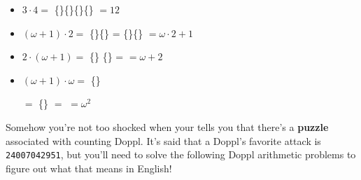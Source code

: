 \begin{itemize}
\item \(3\cdot 4=\)
\{\mappDoppl\mappDoppl\mappDoppl\}\{\mappDoppl\mappDoppl\mappDoppl\}\{\mappDoppl\mappDoppl\mappDoppl\}\{\mappDoppl\mappDoppl\mappDoppl\} \(=12\)

\item \((\omega+1)\cdot 2=\)
\{\mappDopplOmega\mappDoppl\}\{\mappDopplOmega\mappDoppl\} =
\{\mappDopplOmega\}\{\mappDoppl\mappDopplOmega\}\mappDoppl{} \(=\omega\cdot 2+1\)

\item \(2\cdot(\omega+1)=\)
\{\mappDoppl\mappDoppl\}%
\resizebox{0.4in}{!}{\{\mappDoppl\mappDoppl\}}%
\resizebox{0.3in}{!}{\{\mappDoppl\mappDoppl\}}%
\resizebox{0.2in}{!}{\{\mappDoppl\mappDoppl\}}%
\resizebox{0.1in}{!}{\{\mappDoppl\mappDoppl\}}%
\{\mappDoppl\mappDoppl\} =
\mappDopplOmega\mappDoppl\mappDoppl \(=\omega+2\)

\item \((\omega+1)\cdot \omega=\)
\{\mappDopplOmega\mappDoppl\}%
\resizebox{0.6in}{!}{\{\mappDopplOmega\mappDoppl\}}%
\resizebox{0.5in}{!}{\{\mappDopplOmega\mappDoppl\}}%
\resizebox{0.4in}{!}{\{\mappDopplOmega\mappDoppl\}}%
\resizebox{0.3in}{!}{\{\mappDopplOmega\mappDoppl\}}%
\resizebox{0.2in}{!}{\{\mappDopplOmega\mappDoppl\}}%
\resizebox{0.1in}{!}{\{\mappDopplOmega\mappDoppl\}}%

\hspace{0.7in}
\(=\)
\{\mappDopplOmega\}%
\resizebox{0.6in}{!}{\{\mappDoppl\mappDopplOmega\}}%
\resizebox{0.5in}{!}{\{\mappDoppl\mappDopplOmega\}}%
\resizebox{0.4in}{!}{\{\mappDoppl\mappDopplOmega\}}%
\resizebox{0.3in}{!}{\{\mappDoppl\mappDopplOmega\}}%
\resizebox{0.2in}{!}{\{\mappDoppl\mappDopplOmega\}}%
\resizebox{0.1in}{!}{\{\mappDoppl\mappDopplOmega\}}%
\(=\)
\mappDopplOmegaSquared \(=\omega^2\)
\end{itemize}


Somehow you're not too shocked when your \mappMobidex{} tells you that
there's a \textbf{puzzle} associated with counting Doppl. It's said
that a Doppl's favorite \mappMobimon{} attack is \texttt{24007042951},
but you'll need to solve the following Doppl arithmetic problems to
figure out what that means in English!

